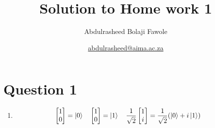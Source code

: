 \documentclass[11pt,twoside=semi,openright,numbers=noenddot]{scrartcl}
\title{Solution to Home work 1}
\author{Abdulrasheed Bolaji Fawole}
\date{\href{mailto:abdulrasheed@aima.ac.za}{abdulrasheed@aima.ac.za}}
\begin{document}
\maketitle

\section*{Question 1}
\begin{enumerate}	
\item \begin{equation*}
\begin{bmatrix}
	1 \\ 0
\end{bmatrix}  = \ket{0} \quad

\begin{bmatrix}
	1 \\ 0
\end{bmatrix}  = \ket{1} \quad

\frac{1}{\sqrt{2}} \begin{bmatrix}
	1 \\ i
\end{bmatrix}  = \frac{1}{\sqrt{2}} (\ket{0} + i \ket{1}) \quad



\end{equation*}

\end{enumerate}
\end{document}
